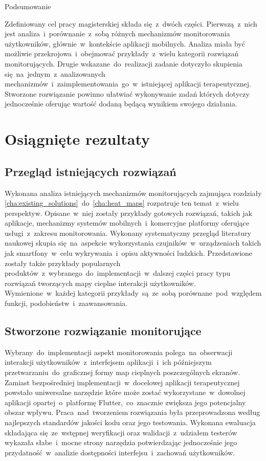  \begin{chapter}{Podsumowanie}
	\newcommand{\chapterPath}{chapters/Summary}

	Zdefiniowany cel pracy magisterskiej składa się~z~dwóch części. Pierwszą~z~nich jest analiza~i~porównanie~z~sobą różnych mechanizmów monitorowania użytkowników, głównie~w~kontekście aplikacji mobilnych. Analiza miała być możliwie przekrojowa~i~obejmować przykłady~z~wielu kategorii rozwiązań monitorujących. Drugie wskazane~do~realizacji zadanie dotyczyło skupienia się~na~jednym~z~analizowanych mechanizmów~i~zaimplementowania~go~w~istniejącej aplikacji terapeutycznej. Stworzone rozwiązanie powinno ułatwiać wykonywanie zadań których dotyczy jednocześnie oferując wartość dodaną będącą wynikiem swojego działania.
	
	\section{Osiągnięte rezultaty}
	
	\subsection{Przegląd istniejących rozwiązań}
	Wykonana analiza istniejących mechanizmów monitorujących zajmująca rozdziały \ref{cha:existing_solutions}~do~\ref{cha:heat_maps} rozpatruje ten temat~z~wielu perspektyw. Opisane~w~niej zostały przykłady gotowych rozwiązań, takich jak aplikacje, mechanizmy systemów mobilnych~i~komercyjne platformy oferujące usługi~z~zakresu monitorowania. Wykonany systematyczny przegląd literatury naukowej skupia się~na~aspekcie wykorzystania czujników~w~urządzeniach takich jak smartfony~w~celu wykrywania~i~opisu aktywności ludzkich. Przedstawione zostały także przykłady popularnych produktów~z~wybranego~do~implementacji~w~dalszej części pracy typu rozwiązań tworzących mapy cieplne interakcji użytkowników. Wymienione~w~każdej kategorii przykłady~są~ze~sobą porównane~pod~względem funkcji, podobieństw~i~zaawansowania.
	
	\subsection{Stworzone rozwiązanie monitorujące}
	Wybrany~do~implementacji aspekt monitorowania polega~na~obserwacji interakcji użytkowników~z~interfejsem aplikacji~i~ich późniejszym przetwarzaniu~do~graficznej formy map cieplnych poszczególnych ekranów. Zamiast bezpośredniej implementacji~w~docelowej aplikacji terapeutycznej powstało uniwersalne narzędzie które może zostać wykorzystane~w~dowolnej aplikacji opartej~o~platformę Flutter,~co~znacznie zwiększa jego potencjalny obszar wpływu. Praca~nad~tworzeniem rozwiązania była przeprowadzona według najlepszych standardów jakości kodu oraz jego testowania. Wykonana ewaluacja składająca się~ze~wstępnej weryfikacji oraz walidacji~z~udziałem testerów wykazała słabe~i~mocne strony narzędzia potwierdzając jednocześnie jego przydatność~w~analizie dostępności interfejsu~i~zachowań użytkowników. 
	

\end{chapter}

